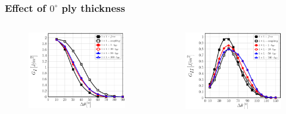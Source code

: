 \documentclass[first,firstsupp,lastsupp,last,hyperref,table]{ETHclass}
\begin{document}
\addtocounter{framenumber}{-1}

\begin{frame}
\frametitle{\vspace{0.2cm}\small Effect of $0^{\circ}$ ply thickness}
\vspace{-.75cm}
\centering
\begin{columns}[c]
\centering
\begin{column}{0.5\textwidth}
\centering
\begin{figure}
\centering
\includegraphics[width=\columnwidth]{1x1-i-vf60-GI-coupling.pdf}
\end{figure}
\end{column}
\begin{column}{0.5\textwidth}
\centering
\begin{figure}
\centering
\includegraphics[width=\columnwidth]{1x1-i-vf60-GII-coupling.pdf}

\end{figure}
\end{column}
\end{columns}
\end{frame}
\end{document}
